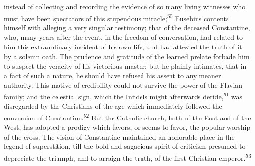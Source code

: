 instead of collecting and recording the evidence of so many living
witnesses who must have been spectators of this stupendous miracle;\textsuperscript{50}
Eusebius contents himself with alleging a very singular testimony; that
of the deceased Constantine, who, many years after the event, in the
freedom of conversation, had related to him this extraordinary incident
of his own life, and had attested the truth of it by a solemn oath. The
prudence and gratitude of the learned prelate forbade him to suspect
the veracity of his victorious master; but he plainly intimates, that
in a fact of such a nature, he should have refused his assent to any
meaner authority. This motive of credibility could not survive the
power of the Flavian family; and the celestial sign, which the Infidels
might afterwards deride,\textsuperscript{51} was disregarded by the Christians of the
age which immediately followed the conversion of Constantine.\textsuperscript{52} But
the Catholic church, both of the East and of the West, has adopted a
prodigy which favors, or seems to favor, the popular worship of the
cross. The vision of Constantine maintained an honorable place in the
legend of superstition, till the bold and sagacious spirit of criticism
presumed to depreciate the triumph, and to arraign the truth, of the
first Christian emperor.\textsuperscript{53}





